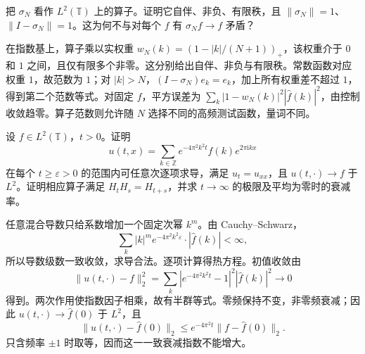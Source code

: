 \begin{exercise}\label{b2:ex:02-fejer-operator}
把 \(\sigma_N\) 看作 \(L^2(\mathbb T)\) 上的算子。证明它自伴、非负、有限秩，且 \(\|\sigma_N\|=1\)、\(\|I-\sigma_N\|=1\)。这为何不与对每个 \(f\) 有 \(\sigma_Nf\to f\) 矛盾？
\end{exercise}
\begin{solution}
在指数基上，算子乘以实权重 \(w_N(k)=(1-|k|/(N+1))_+\)，该权重介于 \(0\) 和 \(1\) 之间，且仅有限多个非零。这分别给出自伴、非负与有限秩。常数函数对应权重 \(1\)，故范数为 \(1\)；对 \(|k|>N\)，\((I-\sigma_N)e_k=e_k\)，加上所有权重差不超过 \(1\)，得到第二个范数等式。对固定 \(f\)，平方误差为 \(\sum_k|1-w_N(k)|^2|\widehat f(k)|^2\)，由控制收敛趋零。算子范数则允许随 \(N\) 选择不同的高频测试函数，量词不同。
\end{solution}

\begin{optionalexercise}\label{b2:ex:02-periodic-heat}
设 \(f\in L^2(\mathbb T)\)，\(t>0\)。证明
\[
 u(t,x)=\sum_{k\in\mathbb Z}e^{-4\pi^2k^2t}\widehat f(k)e^{2\pi\mathrm{i}kx}
\]
在每个 \(t\geq\varepsilon>0\) 的范围内可任意次逐项求导，满足 \(u_t=u_{xx}\)，且 \(u(t,\cdot)\to f\) 于 \(L^2\)。证明相应算子满足 \(H_tH_s=H_{t+s}\)，并求 \(t\to\infty\) 的极限及平均为零时的衰减率。
\end{optionalexercise}
\begin{solution}
任意混合导数只给系数增加一个固定次幂 \(k^m\)。由 Cauchy--Schwarz，
\[
 \sum_k|k|^m e^{-4\pi^2k^2\varepsilon}\cdot|\widehat f(k)|<\infty,
\]
所以导数级数一致收敛，求导合法。逐项计算得热方程。初值收敛由
\[
 \|u(t,\cdot)-f\|_2^2
 =\sum_k|e^{-4\pi^2k^2t}-1|^2|\widehat f(k)|^2\longrightarrow0
\]
得到。两次作用使指数因子相乘，故有半群等式。零频保持不变，非零频衰减；因此 \(u(t,\cdot)\to\widehat f(0)\) 于 \(L^2\)，且
\[
 \|u(t,\cdot)-\widehat f(0)\|_2
 \leq e^{-4\pi^2t}\|f-\widehat f(0)\|_2.
\]
只含频率 \(\pm1\) 时取等，因而这一一致衰减指数不能增大。
\end{solution}

